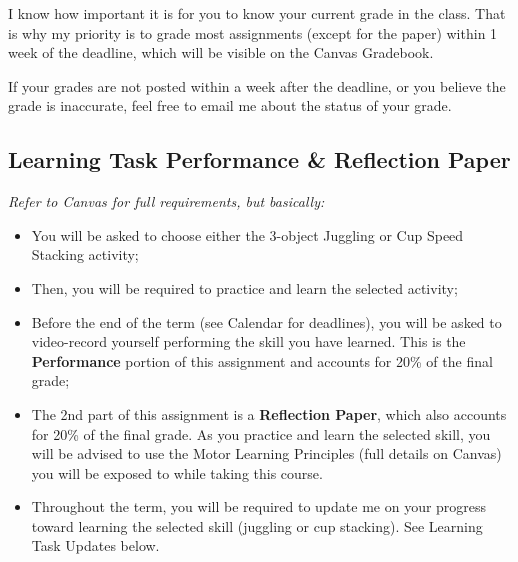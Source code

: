 \documentclass[
  letterpaper,
  DIV=11,
  numbers=noendperiod]{scrartcl}
\providecommand{\tightlist}{%
  \setlength{\itemsep}{0pt}\setlength{\parskip}{0pt}}\usepackage{longtable,booktabs,array}
\begin{document}
\begin{tcolorbox}[enhanced jigsaw, leftrule=.75mm, breakable, opacityback=0, bottomrule=.15mm, rightrule=.15mm, colbacktitle=quarto-callout-note-color!10!white, colframe=quarto-callout-note-color-frame, arc=.35mm, bottomtitle=1mm, left=2mm, title=\textcolor{quarto-callout-note-color}{\faInfo}\hspace{0.5em}{Note}, titlerule=0mm, toptitle=1mm, toprule=.15mm, opacitybacktitle=0.6, colback=white, coltitle=black]

I know how important it is for you to know your current grade in the
class. That is why my priority is to grade most assignments (except for
the paper) within 1 week of the deadline, which will be visible on the
Canvas Gradebook.

If your grades are not posted within a week after the deadline, or you
believe the grade is inaccurate, feel free to email me about the status
of your grade.

\end{tcolorbox}

\hypertarget{learning-task-performance-reflection-paper}{%
\subsection{Learning Task Performance \& Reflection
Paper}\label{learning-task-performance-reflection-paper}}

\emph{Refer to Canvas for full requirements, but basically:}

\begin{itemize}
\tightlist
\item
  You will be asked to choose either the 3-object Juggling or Cup Speed
  Stacking activity;
\item
  Then, you will be required to practice and learn the selected
  activity;
\item
  Before the end of the term (see Calendar for deadlines), you will be
  asked to video-record yourself performing the skill you have learned.
  This is the \textbf{Performance} portion of this assignment and
  accounts for 20\% of the final grade;
\item
  The 2nd part of this assignment is a \textbf{Reflection Paper}, which
  also accounts for 20\% of the final grade. As you practice and learn
  the selected skill, you will be advised to use the Motor Learning
  Principles (full details on Canvas) you will be exposed to while
  taking this course.
\item
  Throughout the term, you will be required to update me on your
  progress toward learning the selected skill (juggling or cup
  stacking). See Learning Task Updates below.
\end{itemize}
\end{document}
